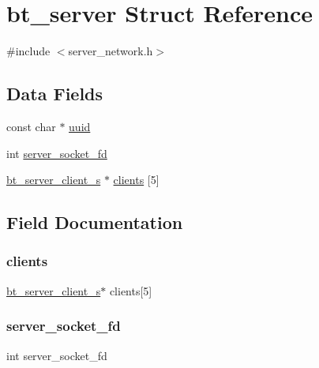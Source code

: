 \hypertarget{structbt__server}{}\section{bt\+\_\+server Struct Reference}
\label{structbt__server}


{\ttfamily \#include $<$server\+\_\+network.\+h$>$}

\subsection*{Data Fields}
\begin{DoxyCompactItemize}
\item 
const char $\ast$ \hyperlink{structbt__server_a0873421d8da2b839db63d6f61cb10d16}{uuid}
\item 
int \hyperlink{structbt__server_a414b264487074929cf23829dcbd25db7}{server\+\_\+socket\+\_\+fd}
\item 
\hyperlink{server__network_8h_a491b22ddf0fd4b110d554133f3290f9a}{bt\+\_\+server\+\_\+client\+\_\+s} $\ast$ \hyperlink{structbt__server_af87276d335d56110f27cf705ba754636}{clients} \mbox{[}5\mbox{]}
\end{DoxyCompactItemize}


\subsection{Field Documentation}
\mbox{\label{structbt__server_af87276d335d56110f27cf705ba754636}} 
\subsubsection{\texorpdfstring{clients}{clients}}
{\footnotesize\ttfamily \hyperlink{server__network_8h_a491b22ddf0fd4b110d554133f3290f9a}{bt\+\_\+server\+\_\+client\+\_\+s}$\ast$ clients\mbox{[}5\mbox{]}}

\mbox{\label{structbt__server_a414b264487074929cf23829dcbd25db7}} 
\subsubsection{\texorpdfstring{server\+\_\+socket\+\_\+fd}{server\_socket\_fd}}
{\footnotesize\ttfamily int server\+\_\+socket\+\_\+fd}


